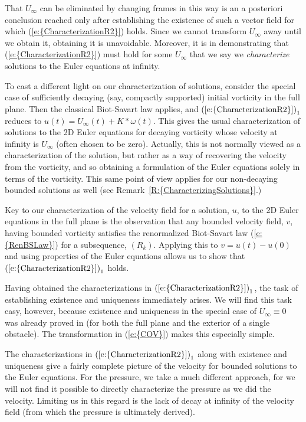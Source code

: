 \documentclass[reqno,openright,11pt,twoside]{amsart}
\theoremstyle{definition}
\numberwithin{equation}{section}
\begin{document}
That $U_{\ensuremath{\infty}}$ can be eliminated by changing frames in this way is an a posteriori conclusion reached only after establishing the existence of such a vector field for which {(\ref{e:{CharacterizationR2}})} holds. Since we cannot transform $U_{\ensuremath{\infty}}$ away until we obtain it, obtaining it is unavoidable. Moreover, it is in demonstrating that {(\ref{e:{CharacterizationR2}})} must hold for some $U_{\ensuremath{\infty}}$ that we say we \textit{characterize} solutions to the Euler equations at infinity.

To cast a different light on our characterization of solutions, consider the special case of sufficiently decaying (say, compactly supported) initial vorticity in the full plane. Then the classical Biot-Savart law applies, and ${(\ref{e:{CharacterizationR2}})}_1$ reduces to
$
    u(t) = U_{\ensuremath{\infty}}(t) + K * \omega(t).
$
This gives the usual characterization of solutions to the 2D Euler equations for decaying vorticity whose velocity at infinity is $U_{\ensuremath{\infty}}$ (often chosen to be zero). Actually, this is not normally viewed as a characterization of the solution, but rather as a way of recovering the velocity from the vorticity, and so obtaining a formulation of the Euler equations solely in terms of the vorticity. This same point of view applies for our non-decaying bounded solutions as well (see {Remark~\ref{R:{CharacterizingSolutions}}}.)

Key to our characterization of the velocity field for a solution, $u$, to the 2D Euler equations in the full plane is the observation that any bounded velocity field, $v$, having bounded vorticity satisfies the renormalized Biot-Savart law {(\ref{e:{RenBSLaw}})} for a subsequence, $(R_k)$. Applying this to $v = u(t) - u(0)$ and using properties of the Euler equations allows us to show that ${(\ref{e:{CharacterizationR2}})}_1$ holds.

Having obtained the characterizations in ${(\ref{e:{CharacterizationR2}})}_1$, the task of establishing existence and uniqueness immediately arises. We will find this task easy, however, because existence and uniqueness in the special case of $U_{\ensuremath{\infty}} \equiv 0$ was already proved in \cite{AKLL2014} (for both the full plane and the exterior of a single obstacle). The transformation in {(\ref{e:{COV}})} makes this especially simple.

The characterizations in ${(\ref{e:{CharacterizationR2}})}_1$ along with existence and uniqueness give a fairly complete picture of the velocity for bounded solutions to the Euler equations. For the pressure, we take a much different approach, for we will not find it possible to directly characterize the pressure as we did the velocity. Limiting us in this regard is the lack of decay at infinity of the velocity field (from which the pressure is ultimately derived).
\end{document}
